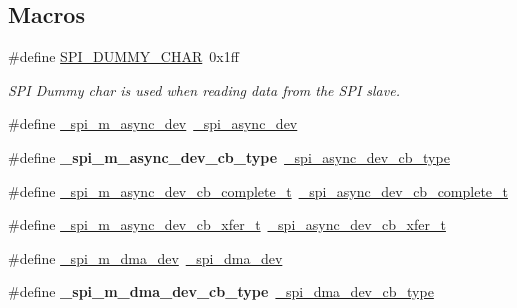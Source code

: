 \subsection*{Macros}
\begin{DoxyCompactItemize}
\item 
\mbox{\label{group__hpl__spi_ga108944a74063db008de048761538192b}} 
\#define \hyperlink{group__hpl__spi_ga108944a74063db008de048761538192b}{S\+P\+I\+\_\+\+D\+U\+M\+M\+Y\+\_\+\+C\+H\+AR}~0x1ff
\begin{DoxyCompactList}\small\item\em S\+PI Dummy char is used when reading data from the S\+PI slave. \end{DoxyCompactList}\item 
\#define \hyperlink{group__hpl__spi_gaab37ebaab3686617eb20d5d175e82e6a}{\+\_\+spi\+\_\+m\+\_\+async\+\_\+dev}~\hyperlink{struct__spi__async__dev}{\+\_\+spi\+\_\+async\+\_\+dev}
\item 
\mbox{\label{group__hpl__spi_ga45e8fd3c7617223ab478f0262dcbd13b}} 
\#define {\bfseries \+\_\+spi\+\_\+m\+\_\+async\+\_\+dev\+\_\+cb\+\_\+type}~\hyperlink{group__hpl__spi_ga0f0c72bc59abef8035904e8e267dfde9}{\+\_\+spi\+\_\+async\+\_\+dev\+\_\+cb\+\_\+type}
\item 
\#define \hyperlink{group__hpl__spi_gae7b65368c281e539d81064e45accc8a9}{\+\_\+spi\+\_\+m\+\_\+async\+\_\+dev\+\_\+cb\+\_\+complete\+\_\+t}~\hyperlink{group__hpl__spi_ga446094494e8aacbf4ad1a74c868d9809}{\+\_\+spi\+\_\+async\+\_\+dev\+\_\+cb\+\_\+complete\+\_\+t}
\item 
\#define \hyperlink{group__hpl__spi_ga91057ea550ac0806ee96b93ee180c7d6}{\+\_\+spi\+\_\+m\+\_\+async\+\_\+dev\+\_\+cb\+\_\+xfer\+\_\+t}~\hyperlink{group__hpl__spi_ga62275ef9b2c245ed2ed183f9d1c98a31}{\+\_\+spi\+\_\+async\+\_\+dev\+\_\+cb\+\_\+xfer\+\_\+t}
\item 
\#define \hyperlink{group__hpl__spi_ga63a73aeb4b9cc78590635e10bb0b1e8b}{\+\_\+spi\+\_\+m\+\_\+dma\+\_\+dev}~\hyperlink{struct__spi__dma__dev}{\+\_\+spi\+\_\+dma\+\_\+dev}
\item 
\mbox{\label{group__hpl__spi_ga286f603c35e402cc2173463af5ca5185}} 
\#define {\bfseries \+\_\+spi\+\_\+m\+\_\+dma\+\_\+dev\+\_\+cb\+\_\+type}~\hyperlink{hpl__spi__dma_8h_a620c54d725b7b6e7f39ebf1c3e67d56f}{\+\_\+spi\+\_\+dma\+\_\+dev\+\_\+cb\+\_\+type}
\item 

\end{DoxyCompactItemize}
